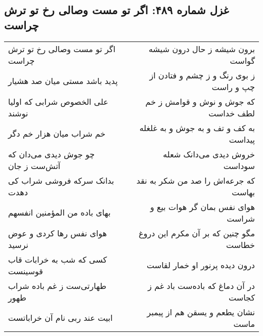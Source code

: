 \begin{center}
\section*{غزل شماره ۴۸۹: اگر تو مست وصالی رخ تو ترش چراست}
\label{sec:0489}
\begin{longtable}{l p{0.5cm} r}
اگر تو مست وصالی رخ تو ترش چراست
&&
برون شیشه ز حال درون شیشه گواست
\\
پدید باشد مستی میان صد هشیار
&&
ز بوی رنگ و ز چشم و فتادن از چپ و راست
\\
علی الخصوص شرابی که اولیا نوشند
&&
که جوش و نوش و قوامش ز خم لطف خداست
\\
خم شراب میان هزار خم دگر
&&
به کف و تف و به جوش و به غلغله پیداست
\\
چو جوش دیدی می‌دان که آتش‌ست ز جان
&&
خروش دیدی می‌دانک شعله سوداست
\\
بدانک سرکه فروشی شراب کی دهدت
&&
که جرعه‌اش را صد من شکر به نقد بهاست
\\
بهای باده من المؤمنین انفسهم
&&
هوای نفس بمان گر هوات بیع و شراست
\\
هوای نفس رها کردی و عوض نرسید
&&
مگو چنین که بر آن مکرم این دروغ خطاست
\\
کسی که شب به خرابات قاب قوسینست
&&
درون دیده پرنور او خمار لقاست
\\
طهارتی‌ست ز غم باده شراب طهور
&&
در آن دماغ که باده‌ست باد غم ز کجاست
\\
ابیت عند ربی نام آن خراباتست
&&
نشان یطعم و یسقن هم از پیمبر ماست
\\
\end{longtable}
\end{center}
